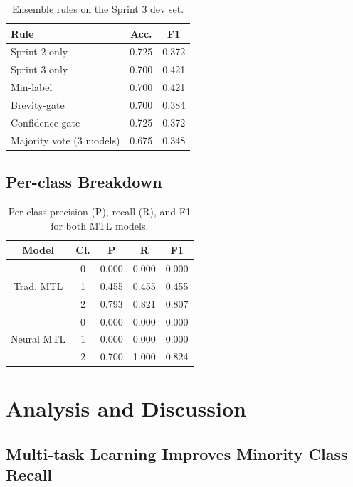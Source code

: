 \documentclass[11pt,twocolumn]{article}
\begin{document}
\begin{table}[ht]
\centering
\small
\begin{tabular}{lcc}
\toprule
\textbf{Rule} & \textbf{Acc.} & \textbf{F1} \\
\midrule
Sprint 2 only             & 0.725 & 0.372 \\
Sprint 3 only             & 0.700 & 0.421 \\
Min-label                 & 0.700 & 0.421 \\
Brevity-gate              & 0.700 & 0.384 \\
Confidence-gate           & 0.725 & 0.372 \\
Majority vote (3 models)  & 0.675 & 0.348 \\
\bottomrule
\end{tabular}
\caption{Ensemble rules on the Sprint 3 dev set.}
\end{table}

\subsection{Per-class Breakdown}

\begin{table}[ht]
\centering
\small
\begin{tabular}{ccccc}
\toprule
\textbf{Model} & \textbf{Cl.} & \textbf{P} & \textbf{R} & \textbf{F1} \\
\midrule
\multirow{3}{*}{Trad. MTL}
  & 0 & 0.000 & 0.000 & 0.000 \\
  & 1 & 0.455 & 0.455 & 0.455 \\
  & 2 & 0.793 & 0.821 & 0.807 \\
\midrule
\multirow{3}{*}{Neural MTL}
  & 0 & 0.000 & 0.000 & 0.000 \\
  & 1 & 0.000 & 0.000 & 0.000 \\
  & 2 & 0.700 & 1.000 & 0.824 \\
\bottomrule
\end{tabular}
\caption{Per-class precision (P), recall (R), and F1 for both MTL models.}
\end{table}

\section{Analysis and Discussion}

\subsection{Multi-task Learning Improves Minority Class Recall}
\end{document}
